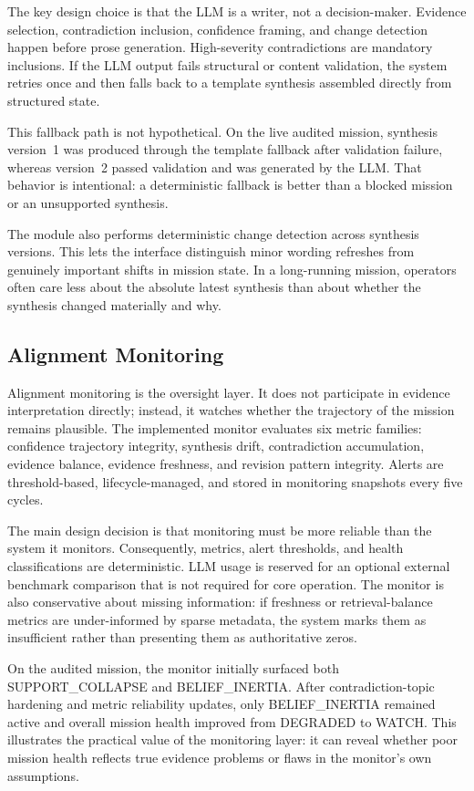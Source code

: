 \documentclass[manuscript,screen,review]{jair}
\begin{document}
The key design choice is that the LLM is a writer, not a decision-maker. Evidence selection, contradiction inclusion, confidence framing, and change detection happen before prose generation. High-severity contradictions are mandatory inclusions. If the LLM output fails structural or content validation, the system retries once and then falls back to a template synthesis assembled directly from structured state.

This fallback path is not hypothetical. On the live audited mission, synthesis version~1 was produced through the template fallback after validation failure, whereas version~2 passed validation and was generated by the LLM. That behavior is intentional: a deterministic fallback is better than a blocked mission or an unsupported synthesis.

The module also performs deterministic change detection across synthesis versions. This lets the interface distinguish minor wording refreshes from genuinely important shifts in mission state. In a long-running mission, operators often care less about the absolute latest synthesis than about whether the synthesis changed materially and why.

\subsection{Alignment Monitoring}
Alignment monitoring is the oversight layer. It does not participate in evidence interpretation directly; instead, it watches whether the trajectory of the mission remains plausible. The implemented monitor evaluates six metric families: confidence trajectory integrity, synthesis drift, contradiction accumulation, evidence balance, evidence freshness, and revision pattern integrity. Alerts are threshold-based, lifecycle-managed, and stored in monitoring snapshots every five cycles.

The main design decision is that monitoring must be more reliable than the system it monitors. Consequently, metrics, alert thresholds, and health classifications are deterministic. LLM usage is reserved for an optional external benchmark comparison that is not required for core operation. The monitor is also conservative about missing information: if freshness or retrieval-balance metrics are under-informed by sparse metadata, the system marks them as insufficient rather than presenting them as authoritative zeros.

On the audited mission, the monitor initially surfaced both SUPPORT\_COLLAPSE and BELIEF\_INERTIA. After contradiction-topic hardening and metric reliability updates, only BELIEF\_INERTIA remained active and overall mission health improved from DEGRADED to WATCH. This illustrates the practical value of the monitoring layer: it can reveal whether poor mission health reflects true evidence problems or flaws in the monitor's own assumptions.
\end{document}
